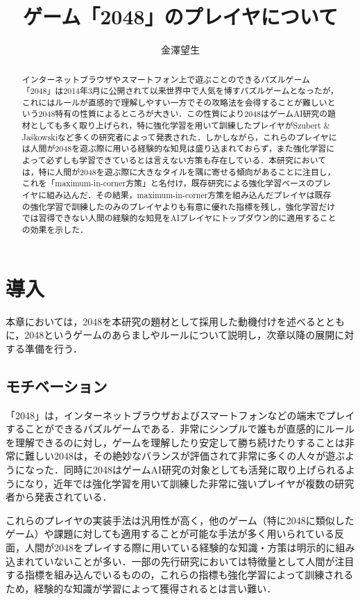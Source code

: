 \documentclass{suribt}
\title{ゲーム「2048」のプレイヤについて}
\author{金澤望生}
\begin{document}
\maketitle

\frontmatter
\begin{abstract}
インターネットブラウザやスマートフォン上で遊ぶことのできるパズルゲーム「2048」は2014年3月に公開されて以来世界中で人気を博すパズルゲームとなったが，これにはルールが直感的で理解しやすい一方でその攻略法を会得することが難しいという2048特有の性質によるところが大きい．この性質により2048はゲームAI研究の題材としても多く取り上げられ，特に強化学習を用いて訓練したプレイヤがSzubert \& Ja\'{s}kowskiなど多くの研究者によって発表された．しかしながら，これらのプレイヤには人間が2048を遊ぶ際に用いる経験的な知見は盛り込まれておらず，また強化学習によって必ずしも学習できているとは言えない方策も存在している．本研究においては，特に人間が2048を遊ぶ際に大きなタイルを隅に寄せる傾向があることに注目し，これを「maximum-in-corner方策」と名付け，既存研究による強化学習ベースのプレイヤに組み込んだ．その結果，maximum-in-corner方策を組み込んだプレイヤは既存の強化学習で訓練したのみのプレイヤよりも有意に優れた指標を残し，強化学習だけでは習得できない人間の経験的な知見をAIプレイヤにトップダウン的に適用することの効果を示した．
\end{abstract}

\tableofcontents

\mainmatter
\chapter{導入}
本章においては，2048を本研究の題材として採用した動機付けを述べるとともに，2048というゲームのあらましやルールについて説明し，次章以降の展開に対する準備を行う．

\section{モチベーション}
「2048」\cite{2048game}は，インターネットブラウザおよびスマートフォンなどの端末でプレイすることができるパズルゲームである．非常にシンプルで誰もが直感的にルールを理解できるのに対し，ゲームを理解したり安定して勝ち続けたりすることは非常に難しい\cite{Szubert}2048は，その絶妙なバランスが評価されて非常に多くの人々が遊ぶようになった．同時に2048はゲームAI研究の対象としても活発に取り上げられるようになり，近年では強化学習を用いて訓練した非常に強いプレイヤが複数の研究者から発表されている\cite{Szubert}\cite{Wu}\cite{Oka}\cite{Yeh}\cite{Jaskowski}．

これらのプレイヤの実装手法は汎用性が高く，他のゲーム（特に2048に類似したゲーム）や課題に対しても適用することが可能な手法が多く用いられている\cite{Yeh}反面，人間が2048をプレイする際に用いている経験的な知識・方策は明示的に組み込まれていないことが多い．一部の先行研究においては特徴量として人間が注目する指標を組み込んでいる\cite{Yeh}ものの，これらの指標も強化学習によって訓練されるため，経験的な知識が学習によって獲得されるとは言い難い．
\end{document}
